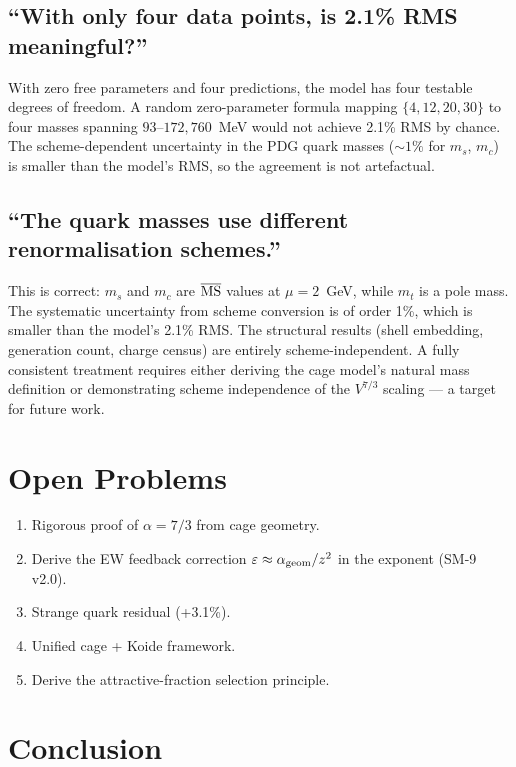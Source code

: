 \documentclass[11pt,letterpaper]{article}
\begin{document}
\subsection{``With only four data points, is 2.1\% RMS meaningful?''}
With zero free parameters and four predictions, the model has
four testable degrees of freedom.  A random zero-parameter formula
mapping $\{4, 12, 20, 30\}$ to four masses spanning $93$--$172{,}760$~MeV
would not achieve 2.1\% RMS by chance.  The scheme-dependent
uncertainty in the PDG quark masses ($\sim 1\%$ for $m_s$, $m_c$)
is smaller than the model's RMS, so the agreement is not artefactual.

\subsection{``The quark masses use different renormalisation schemes.''}
This is correct: $m_s$ and $m_c$ are $\overline{\rm MS}$ values at
$\mu = 2$~GeV, while $m_t$ is a pole mass.  The systematic
uncertainty from scheme conversion is of order 1\%, which is
smaller than the model's 2.1\% RMS.  The structural results (shell
embedding, generation count, charge census) are entirely
scheme-independent.  A fully consistent treatment requires either
deriving the cage model's natural mass definition or demonstrating
scheme independence of the $V^{7/3}$ scaling --- a target for
future work.

\section{Open Problems}
\label{sec:future}

\begin{enumerate}
\item Rigorous proof of $\alpha = 7/3$ from cage geometry.
\item Derive the EW feedback correction $\varepsilon \approx
  \alpha_{\rm geom}/z^2$ in the exponent (SM-9 v2.0).
\item Strange quark residual (+3.1\%).
\item Unified cage + Koide framework.
\item Derive the attractive-fraction selection principle.
\end{enumerate}

\section{Conclusion}
\label{sec:conclusion}
\end{document}
